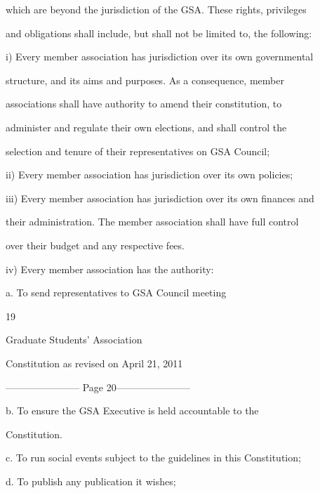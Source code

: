 \documentclass{article}
\begin{document}
which are beyond the jurisdiction of the GSA. These rights, privileges  

and obligations shall include, but shall not be limited to, the following:  



i)      Every member association has jurisdiction over its own governmental  

structure,  and  its  aims  and  purposes.  As  a  consequence,  member  

associations   shall   have   authority   to   amend   their   constitution,   to  

administer  and  regulate  their  own  elections,  and  shall  control  the  

selection and tenure of their representatives on GSA Council;  



ii)     Every member association has jurisdiction over its own policies;  



iii)    Every  member association has jurisdiction over its own finances and  

their  administration.  The  member  association  shall  have  full  control  

over their budget and any respective fees.  



iv)     Every member association has the authority:  



a.  To send representatives to GSA Council meeting  



 

      19  



Graduate Students’ Association  



   Constitution as revised on April 21, 2011  


----------------------- Page 20-----------------------

b.  To    ensure    the    GSA     Executive      is   held   accountable       to  the  

    Constitution.  



c.  To run social events subject to the guidelines in this Constitution;  



d.  To publish any publication it wishes;  
\end{document}
